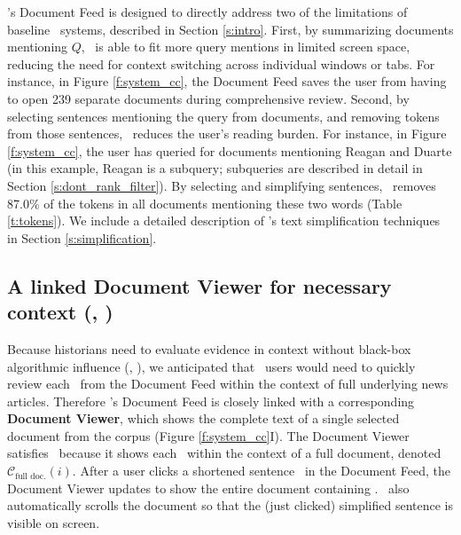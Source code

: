 \ours's Document Feed is designed to directly address two of the limitations of baseline \Baselongname~systems, described in Section \ref{s:intro}.
First, by summarizing documents mentioning $Q$, \ours~is able to fit more query mentions in limited screen space, reducing the need for context switching across individual windows or tabs.
For instance, in Figure \ref{f:system_cc}, the Document Feed saves the user from having to open 239 separate documents during comprehensive review.
Second, by selecting sentences mentioning the query from documents, and removing tokens from those sentences, \ours~reduces the user's reading burden.
For instance, in Figure \ref{f:system_cc}, the user has queried for documents mentioning Reagan and Duarte (in this example, Reagan is a subquery; subqueries are described in detail in Section \ref{s:dont_rank_filter}).
By selecting and simplifying sentences, \ours~removes 87.0\% of the tokens in all documents mentioning these two words (Table \ref{t:tokens}).
We include a detailed description of \ours's text simplification techniques in Section \ref{s:simplification}.


\subsection{A linked Document Viewer for necessary context (\rcontext, \rnoconfound)}\label{s:documentviewer}

Because historians need to evaluate evidence in context without black-box algorithmic influence (\rcontext, \rnoconfound), we anticipated that \ours~users would need to quickly review each \specificmention~from the Document Feed within the context of full underlying news articles.
Therefore \ours's Document Feed is closely linked with a corresponding \textbf{Document Viewer}, which shows the complete text of a single selected document from the corpus (Figure \ref{f:system_cc}I).
The Document Viewer satisfies \rcontext~because it shows each \specificmention~within the context of a full document, denoted $\mathcal{C}_{\text{full doc.}}(i)$.
After a user clicks a shortened sentence \simplifiedsentence~in the Document Feed, the Document Viewer updates to show the entire document containing \simplifiedsentence. 
\ours~also automatically scrolls the document so that the (just clicked) simplified sentence is visible on screen.

